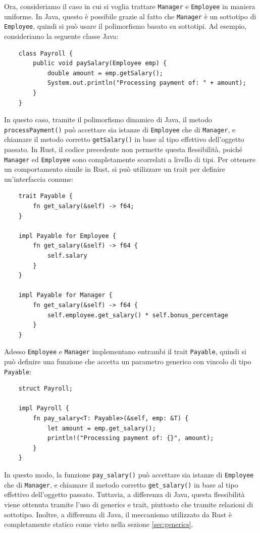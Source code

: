 Ora, consideriamo il caso in cui si voglia trattare \texttt{Manager} e \texttt{Employee} in maniera uniforme. In Java, questo è possibile grazie al fatto che \texttt{Manager} è un sottotipo di \texttt{Employee}, quindi si può usare il polimorfismo basato su sottotipi. Ad esempio, consideriamo la seguente classe Java:
\begin{verbatim}
    class Payroll {
        public void paySalary(Employee emp) {
            double amount = emp.getSalary();
            System.out.println("Processing payment of: " + amount);
        }
    }
\end{verbatim}
In questo caso, tramite il polimorfismo dinamico di Java, il metodo \texttt{processPayment()} può accettare sia istanze di \texttt{Employee} che di \texttt{Manager}, e chiamare il metodo corretto \texttt{getSalary()} in base al tipo effettivo dell'oggetto passato. In Rust, il codice precedente non permette questa flessibilità, poiché \texttt{Manager} ed \texttt{Employee} sono completamente scorrelati a livello di tipi. Per ottenere un comportamento simile in Rust, si può utilizzare un trait per definire un'interfaccia comune:
\begin{verbatim}
    trait Payable {
        fn get_salary(&self) -> f64;
    }

    impl Payable for Employee {
        fn get_salary(&self) -> f64 {
            self.salary
        }
    }

    impl Payable for Manager {
        fn get_salary(&self) -> f64 {
            self.employee.get_salary() * self.bonus_percentage
        }
    }
\end{verbatim}
Adesso \texttt{Employee} e \texttt{Manager} implementano entrambi il trait \texttt{Payable}, quindi si può definire una funzione che accetta un parametro generico con vincolo di tipo \texttt{Payable}:
\begin{verbatim}
    struct Payroll;

    impl Payroll {
        fn pay_salary<T: Payable>(&self, emp: &T) {
            let amount = emp.get_salary();
            println!("Processing payment of: {}", amount);
        }
    }
\end{verbatim}
In questo modo, la funzione \texttt{pay\_salary()} può accettare sia istanze di \texttt{Employee} che di \texttt{Manager}, e chiamare il metodo corretto \texttt{get\_salary()} in base al tipo effettivo dell'oggetto passato. Tuttavia, a differenza di Java, questa flessibilità viene ottenuta tramite l'uso di generics e trait, piuttosto che tramite relazioni di sottotipo. Inoltre, a differenza di Java, il meccanismo utilizzato da Rust è completamente statico come visto nella sezione \ref{sec:generics}. 

